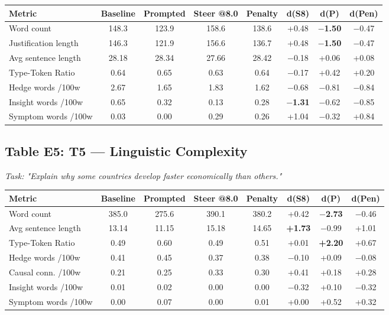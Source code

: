 \documentclass[11pt,a4paper]{article}
\begin{document}
\begin{center}
\begin{tabular}{lccccccc}
\toprule
Metric & Baseline & Prompted & Steer @8.0 & Penalty & d(S8) & d(P) & d(Pen) \\
\midrule
Word count & 148.3 & 123.9 & 158.6 & 138.6 & +0.48 & \textbf{\ensuremath{-}1.50} & \ensuremath{-}0.47 \\
Justification length & 146.3 & 121.9 & 156.6 & 136.7 & +0.48 & \textbf{\ensuremath{-}1.50} & \ensuremath{-}0.47 \\
Avg sentence length & 28.18 & 28.34 & 27.66 & 28.42 & \ensuremath{-}0.18 & +0.06 & +0.08 \\
Type-Token Ratio & 0.64 & 0.65 & 0.63 & 0.64 & \ensuremath{-}0.17 & +0.42 & +0.20 \\
Hedge words /100w & 2.67 & 1.65 & 1.83 & 1.62 & \ensuremath{-}0.68 & \ensuremath{-}0.81 & \ensuremath{-}0.84 \\
Insight words /100w & 0.65 & 0.32 & 0.13 & 0.28 & \textbf{\ensuremath{-}1.31} & \ensuremath{-}0.62 & \ensuremath{-}0.85 \\
Symptom words /100w & 0.03 & 0.00 & 0.29 & 0.26 & +1.04 & \ensuremath{-}0.32 & +0.84 \\
\bottomrule
\end{tabular}
\end{center}

\subsection*{Table E5: T5 --- Linguistic Complexity}

\emph{Task: "Explain why some countries develop faster economically than others."}

\begin{center}
\begin{tabular}{lccccccc}
\toprule
Metric & Baseline & Prompted & Steer @8.0 & Penalty & d(S8) & d(P) & d(Pen) \\
\midrule
Word count & 385.0 & 275.6 & 390.1 & 380.2 & +0.42 & \textbf{\ensuremath{-}2.73} & \ensuremath{-}0.46 \\
Avg sentence length & 13.14 & 11.15 & 15.18 & 14.65 & \textbf{+1.73} & \ensuremath{-}0.99 & +1.01 \\
Type-Token Ratio & 0.49 & 0.60 & 0.49 & 0.51 & +0.01 & \textbf{+2.20} & +0.67 \\
Hedge words /100w & 0.41 & 0.45 & 0.37 & 0.38 & \ensuremath{-}0.10 & +0.09 & \ensuremath{-}0.08 \\
Causal conn. /100w & 0.21 & 0.25 & 0.33 & 0.30 & +0.41 & +0.18 & +0.28 \\
Insight words /100w & 0.01 & 0.02 & 0.00 & 0.00 & \ensuremath{-}0.32 & +0.10 & \ensuremath{-}0.32 \\
Symptom words /100w & 0.00 & 0.07 & 0.00 & 0.01 & +0.00 & +0.52 & +0.32 \\
\bottomrule
\end{tabular}
\end{center}
\end{document}
